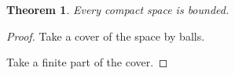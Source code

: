 \documentclass{article}
\newtheorem{theorem}{Theorem}
\begin{document}
\begin{theorem} Every compact space is bounded. \end{theorem}
\begin{proof}
 Take a cover of the space by balls.

 Take a finite part of the cover.
\end{proof}
\end{document}
